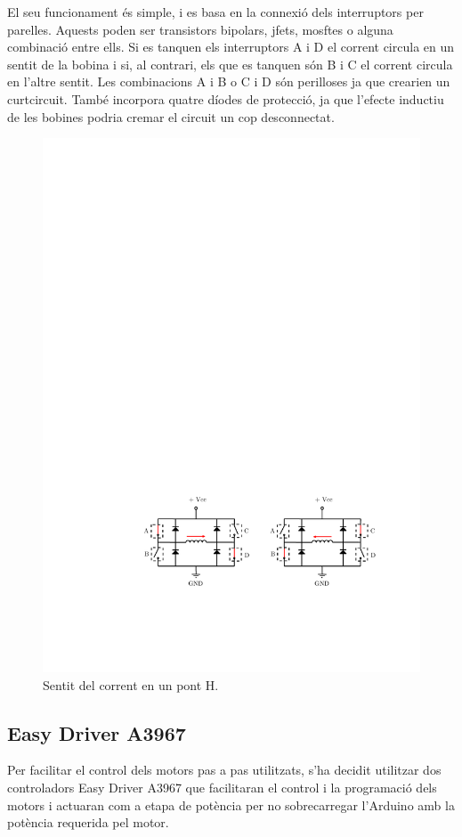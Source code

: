 El seu funcionament és simple, i es basa en la connexió dels interruptors per parelles. Aquests poden ser transistors bipolars, jfets, mosftes o alguna combinació entre ells. Si es tanquen els interruptors A i D el corrent circula en un sentit de la bobina i si, al contrari, els que es tanquen són B i C el corrent circula en l'altre sentit. Les combinacions A i B o C i D són perilloses ja que crearien un curtcircuit. També incorpora quatre díodes de protecció, ja que l'efecte inductiu de les bobines podria cremar el circuit un cop desconnectat.

\begin{figure}[H]
	\centering
	\includegraphics{PontHfuncionament}
	\caption{Sentit del corrent en un pont H.}
	\label{fig:ponthfuncionament}
\end{figure}


\subsection{Easy Driver A3967}
Per facilitar el control dels motors pas a pas utilitzats, s'ha decidit utilitzar dos controladors Easy Driver A3967 \cite{driverbib} que facilitaran el control i la programació dels motors i actuaran com a etapa de potència per no sobrecarregar l'Arduino amb la potència requerida pel motor.


